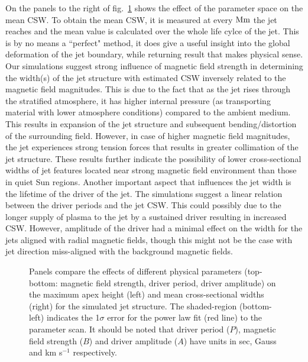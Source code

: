 \documentclass[12pt]{ociamthesis}
\begin{document}
%
On the panels to the right of fig.~\ref{parameter_scan_lines} shows the effect of the parameter space on the mean CSW. To obtain the mean CSW, it is measured at every $\rm{Mm}$ the jet reaches and the mean value is calculated over the whole life cylce of the jet. This is by no means a ``perfect" method, it does give a useful insight into the global deformation of the jet boundary, while returning result that makes physical sense. Our simulations suggest strong influence of magnetic field strength in determining the width(s) of the jet structure with estimated CSW inversely related to the magnetic field magnitudes. This is due to the fact that as the jet rises through the stratified atmosphere, it has higher internal pressure (as transporting material with lower atmosphere conditions) compared to the ambient medium. This results in expansion of the jet structure and subsequent bending/distortion of the surrounding field. However, in case of higher magnetic field magnitudes, the jet experiences strong tension forces that results in greater collimation of the jet structure. These results further indicate the possibility of lower cross-sectional widths of jet features located near strong magnetic field environment than those in quiet Sun regions. Another important aspect that influences the jet width is the lifetime of the driver of the jet. The simulations suggest a linear relation between the driver periods and the jet CSW. This could possibly due to the longer supply of plasma to the jet by a sustained driver resulting in increased CSW. However, amplitude of the driver had a minimal effect on the width for the jets aligned with radial magnetic fields, though this might not be the case with jet direction miss-aligned with the background magnetic fields.
\begin{figure}
\captionsetup[subfigure]{labelformat=empty}
\centering
{} 
\caption{Panels compare the effects of different physical parameters (top-bottom: magnetic field strength, driver period, driver amplitude) on the maximum apex height (left) and mean cross-sectional widths (right) for the simulated jet structure. The shaded-region (bottom-left) indicates the 1$\sigma$ error for the power law fit (red line) to the parameter scan. It should be noted that driver period ($P$), magnetic field strength ($B$) and driver amplitude ($A$) have units in sec, Gauss and km s$^{-1}$ respectively.}
\label{parameter_scan_lines}
\end{figure}
\end{document}
